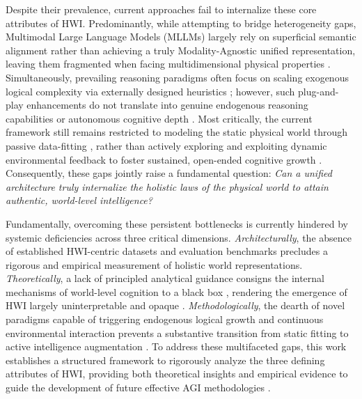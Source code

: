 Despite their prevalence, current approaches fail to internalize these core attributes of HWI.
Predominantly, while attempting to bridge heterogeneity gaps, Multimodal Large Language Models (MLLMs) largely rely on superficial semantic alignment \cite{radford2021learning} rather than achieving a truly Modality-Agnostic unified representation, leaving them fragmented when facing multidimensional physical properties \cite{wu2024next, tong2024eyes}.
Simultaneously, prevailing reasoning paradigms often focus on scaling exogenous logical complexity via externally designed heuristics \cite{wei2022chain, yao2023tree}; however, such plug-and-play enhancements do not translate into genuine endogenous reasoning capabilities or autonomous cognitive depth \cite{huang2023large}.
Most critically, the current framework still remains restricted to modeling the static physical world through passive data-fitting \cite{kaplan2020scaling}, rather than actively exploring and exploiting dynamic environmental feedback to foster sustained, open-ended cognitive growth \cite{wang2023voyager}.
Consequently, these gaps jointly raise a fundamental question: \emph{Can a unified architecture truly internalize the holistic laws of the physical world to attain authentic, world-level intelligence?}

Fundamentally, overcoming these persistent bottlenecks is currently hindered by systemic deficiencies across three critical dimensions.
\emph{Architecturally}, the absence of established HWI-centric datasets and evaluation benchmarks \cite{srivastava2022behavior, gu2023maniskill2} precludes a rigorous and empirical measurement of holistic world representations.
\emph{Theoretically}, a lack of principled analytical guidance consigns the internal mechanisms of world-level cognition to a black box \cite{li2022emergent}, rendering the emergence of HWI largely uninterpretable and opaque \cite{nanda2023progress}.
\emph{Methodologically}, the dearth of novel paradigms capable of triggering endogenous logical growth and continuous environmental interaction prevents a substantive transition from static fitting to active intelligence augmentation \cite{park2023generative}.
To address these multifaceted gaps, this work establishes a structured framework to rigorously analyze the three defining attributes of HWI, providing both theoretical insights and empirical evidence to guide the development of future effective AGI methodologies \cite{bengio2021deep}.

